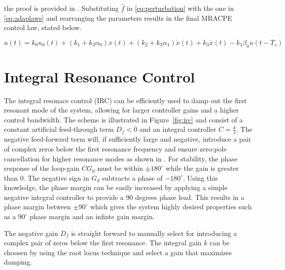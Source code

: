 the proof is provided in \citep{Qingson:2016}. Substituting $\hat{f}$ in \eqref{eq:perturbation} with the one in \eqref{eq:adaplaws} and rearranging the parameters results in the final MRACPE control law, stated below.

\begin{equation}
    \label{eq:adaplawsfinal}
  u(t) = k_0u_d(t) + (k_1 + k_3\alpha_0)x(t) +  (k_2 + k_3\alpha_1)\dot{x}(t) + k_3\ddot{x}(t) - k_3\beta_0u(t-T_s)
\end{equation}


\section{Integral Resonance Control}
The integral resonace control (IRC) can be efficiently used to damp out the first resonant mode of the system, allowing for larger controller gains and a higher control bandwidth. The \abbrIRC scheme is illustrated in Figure~\ref{fig:irc} and consist of a constant artificial feed-through term $D_f<0$ and an integral controller $C=\frac{k}{s}$. The negative feed-forward term will, if sufficiently large and negative, introduce a pair of complex zeros below the first resonance frequency and ensure zero-pole cancellation for higher resonance modes as shown in \citep{Aphale:2007}. For stability, the phase response of the loop-gain $CG_d$ must be within $\pm180^{\circ}$ while the gain is greater than 0. The negative sign in $G_d$ subtracts a phase of $-180^{\circ}$. Using this knowledge, the phase margin can be easily increased by applying a simple negative integral controller to provide a 90 degrees phase lead. This results in a phase margin between  $\pm90^{\circ}$ which gives the system highly desired properties such as a $90^{\circ}$ phase margin and an infinte gain margin.

The negative gain $D_f$ is straight forward to manually select for introducing a complex pair of zeros below the first resonance. The integral gain $k$ can be choosen by using the root locus technique and select a gain that maximizes damping.


